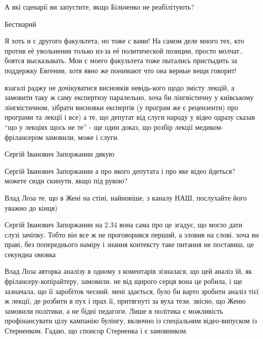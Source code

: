 \begin{itemize}

А які сценарії ви запустите, якщо Більченко не реабілітують?


Бестиарий


Я хоть и с другого факультета, но тоже с вами! На самом деле много тех, кто
против её увольнения только из-за её политической позиции, просто молчат..
боятся высказывать. Мои с моего факультета тоже пытались пристыдить за
поддержку Евгении, хотя явно же понимают что она верные вещи говорит!


взагалі раджу не дочікуватися висновків невідь-кого щодо змісту лекцій, а
замовити таку ж саму експертизу паралельно, хоча би лінгвістичну у київському
лінгвістичном, зібрати висновки експертів (у програм же є рецензенти) про
програми та лекції і все) а те, що депутат від слуги народу у відео одразу
сказав \enquote{що у лекціях щось не те} - ще один доказ, що розбір лекції
медиком-фрілансером замовили, може і слуги.

\begin{itemize}

Сергій Іванович Запоржанин дякую


Сергій Іванович Запоржанин а про якого депутата і про яке відео йдеться? можете
сюди скинути, якщо під рукою?


Влад Лоза те, що в Жені на стіні, найновіше, з каналу НАШ, послухайте його уважно до кінця)


Сергій Іванович Запоржанин на 2.34 вона сама про це згадує, що могло дати слузі
зачіпку. Тобто він все ж не проговорився перший, а зловив на слові. хоча ви
праві, без попереднього наміру і знання контексту таке питання не поставиш, це
секундна омовка


Влад Лоза авторка аналізу в одному з коментарів зізналася, що цей аналіз їй, як
фрілансеру-копірайтеру, замовили. не від щирого серця вона це робила, і ще
зазначала, що її заробіток чесний. мені здається, було би варто зробити аналіз
тієї ж лекції, де розбити в пух і прах її, притягнуті за вуха тези. звісно, що
Женю замовили політики, а не бідні педагоги. Лише в політика є можливість
профінансувати цілу кампанію булінгу, включно із спеціальним відео-випуском із
Стерненком. Гадаю, що спонсор Стерненка і є замовником.


\end{itemize}
\end{itemize}
